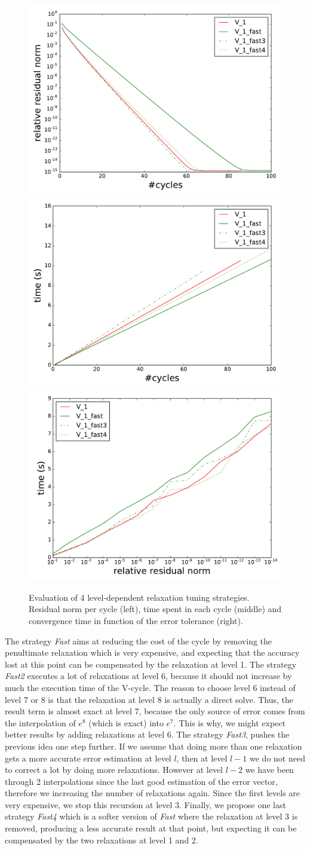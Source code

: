 \begin{figure}
    \includegraphics[width=0.33\linewidth]{figs/convergence_fast_norm.pdf}
    \includegraphics[width=0.33\linewidth]{figs/convergence_fast_time.pdf}
    \includegraphics[width=0.33\linewidth]{figs/time_convergence_fast.pdf}
    \caption{Evaluation of 4 level-dependent relaxation tuning strategies.
    Residual norm per cycle (left), time spent in each cycle (middle) and
    convergence time in function of the error tolerance (right).}
    \label{fig.newstrat}
\end{figure}

The strategy \emph{Fast} aims at reducing the cost of the cycle by removing the
penultimate relaxation which is very expensive, and expecting that the accuracy
lost at this point can be compensated by the relaxation at level 1.  The
strategy \emph{Fast2} executes a lot of relaxations at level 6, because it
should not increase by much the execution time of the V-cycle.  The reason to
choose level 6 instead of level 7 or 8 is that the relaxation at level 8 is
actually a direct solve. Thus, the result term is almost exact at level 7,
because the only source of error comes from the interpolation of $e^8$ (which
is exact) into $e^7$. This is why, we might expect better results by adding
relaxations at level 6. The strategy \emph{Fast3}, pushes the previous idea one
step further. If we assume that doing more than one relaxation gets a more
accurate error estimation at level $l$, then at level $l-1$ we do not need to
correct a lot by doing more relaxations. However at level $l-2$ we have been
through 2 interpolations since the last good estimation of the error vector,
therefore we increasing the number of relaxations again. Since the first levels
are very expensive, we stop this recursion at level 3.  Finally, we propose one
last strategy \emph{Fast4} which is a softer version of \emph{Fast} where the
relaxation at level 3 is removed, producing a less accurate result at that
point, but expecting it can be compensated by the two relaxations at level 1
and 2.

